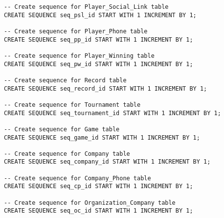 \begin{lstlisting}[caption={Sequence Creation},label={lst:sequence}]
-- Create sequence for Player_Social_Link table
CREATE SEQUENCE seq_psl_id START WITH 1 INCREMENT BY 1;

-- Create sequence for Player_Phone table
CREATE SEQUENCE seq_pp_id START WITH 1 INCREMENT BY 1;

-- Create sequence for Player_Winning table
CREATE SEQUENCE seq_pw_id START WITH 1 INCREMENT BY 1;

-- Create sequence for Record table
CREATE SEQUENCE seq_record_id START WITH 1 INCREMENT BY 1;

-- Create sequence for Tournament table
CREATE SEQUENCE seq_tournament_id START WITH 1 INCREMENT BY 1;

-- Create sequence for Game table
CREATE SEQUENCE seq_game_id START WITH 1 INCREMENT BY 1;

-- Create sequence for Company table
CREATE SEQUENCE seq_company_id START WITH 1 INCREMENT BY 1;

-- Create sequence for Company_Phone table
CREATE SEQUENCE seq_cp_id START WITH 1 INCREMENT BY 1;

-- Create sequence for Organization_Company table
CREATE SEQUENCE seq_oc_id START WITH 1 INCREMENT BY 1;

\end{lstlisting}

